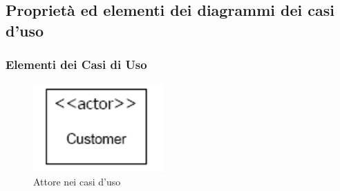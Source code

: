 \documentclass{article}
\begin{document}
	\subsection{Proprietà ed elementi dei diagrammi dei casi d’uso}
	\subsubsection{Elementi dei Casi di Uso}
	\begin{figure}[h]
		\centering
		\includegraphics[scale=0.3]{29.actor.png}
		\caption{Attore nei casi d'uso}
		\label{fig:im-29}
	\end{figure}
\end{document}
